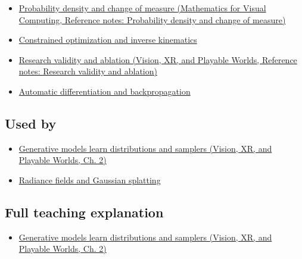 \hypertarget{appendix-2c568f05ee34-prerequisites}{}

\begin{itemize}
\tightlist
\item
  \href{../02-Mathematics-for-Visual-Computing/main.pdf\#nameddest=appendix-4815cd87ab8b}{Probability density and change of measure (Mathematics for Visual Computing, Reference notes: Probability density and change of measure)}
\item
  \hyperref[appendix-29f4bea4c2bb]{Constrained optimization and inverse kinematics}
\item
  \href{../07-Vision-XR-and-Playable-Worlds/main.pdf\#nameddest=appendix-65788587ef78}{Research validity and ablation (Vision, XR, and Playable Worlds, Reference notes: Research validity and ablation)}
\item
  \hyperref[appendix-40df0855b4a7]{Automatic differentiation and backpropagation}
\end{itemize}

\subsection{Used by}\label{appendix-2c568f05ee34-used-by}

\hypertarget{appendix-2c568f05ee34-used-by}{}

\begin{itemize}
\tightlist
\item
  \href{../07-Vision-XR-and-Playable-Worlds/main.pdf\#nameddest=04-visual-computing-ii-ch031-generative-models-learn-distributions-and-samplers}{Generative models learn distributions and samplers (Vision, XR, and Playable Worlds, Ch. 2)}
\item
  \hyperref[appendix-c5b332e400e7]{Radiance fields and Gaussian splatting}
\end{itemize}

\subsection{Full teaching explanation}\label{appendix-2c568f05ee34-full-teaching-explanation}

\hypertarget{appendix-2c568f05ee34-full-teaching-explanation}{}

\begin{itemize}
\tightlist
\item
  \href{../07-Vision-XR-and-Playable-Worlds/main.pdf\#nameddest=04-visual-computing-ii-ch031-generative-models-learn-distributions-and-samplers}{Generative models learn distributions and samplers (Vision, XR, and Playable Worlds, Ch. 2)}
\end{itemize}

